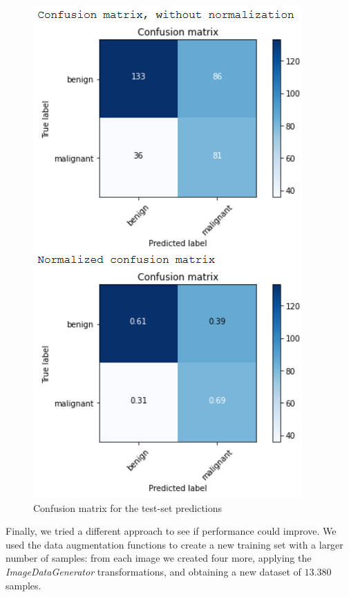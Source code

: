 \documentclass[11pt,a4paper,oneside]{article}
\begin{document}
\begin{figure}[h]
\begin{minipage}[c]{.4\textwidth}
		\includegraphics[width=.9\textwidth]{images/2.2/7_matrix}
		\caption{Confusion matrix for the test-set predictions}
		\label{fig:matrix_2.2_1_weights}
	\end{minipage}%
\end{figure}


Finally, we tried a different approach to see if performance could improve. We used the data augmentation functions to create a new training set with a larger number of samples: from each image we created four more, applying the \textit{ImageDataGenerator} transformations, and obtaining a new dataset of $13.380$ samples.
\end{document}
